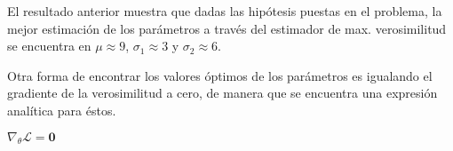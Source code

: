 \documentclass[11pt]{article}
\begin{document}
    El resultado anterior muestra que dadas las hipótesis puestas en el
problema, la mejor estimación de los parámetros a través del estimador
de max. verosimilitud se encuentra en \(\mu \approx 9\),
\(\sigma_{1} \approx 3\) y \(\sigma_{2} \approx 6\).

Otra forma de encontrar los valores óptimos de los parámetros es
igualando el gradiente de la verosimilitud a cero, de manera que se
encuentra una expresión analítica para éstos.

\(\nabla_{\theta} \mathcal{L} = \textbf{0}\)


    
    
    
    
\end{document}
